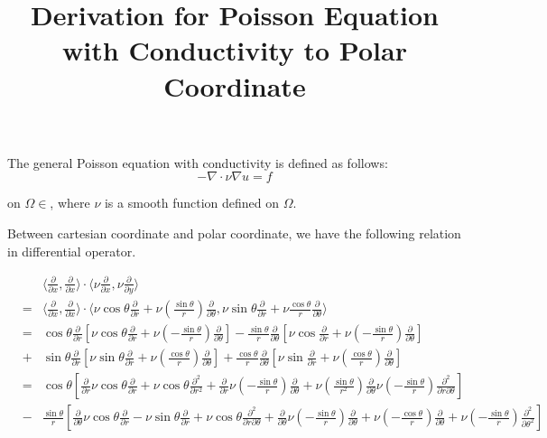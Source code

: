 \documentclass[11pt,letterpaper]{article}
\begin{document}
\title{{\bfseries Derivation for Poisson Equation with Conductivity to Polar Coordinate} }

The general Poisson equation with conductivity is defined as follows:
\begin{equation}
- \nabla \cdot \nu \nabla u = f
\end{equation}

on $\Omega \in $, where $\nu$ is a smooth function defined on $\Omega$.

Between cartesian coordinate and polar coordinate, we have the following relation in differential operator.

\begin{eqnarray}
&& \langle \frac{\partial}{\partial x}, \frac{\partial}{\partial x} \rangle \cdot \langle \nu \frac{\partial}{\partial x}, \nu \frac{\partial}{\partial y}\rangle  \\
&=&\langle \frac{\partial}{\partial x}, \frac{\partial}{\partial x}\rangle \cdot \langle \nu \cos\theta \frac{\partial}{\partial r}+\nu(\frac{\sin\theta}{r})\frac{\partial}{\partial \theta},\nu\sin\theta\frac{\partial}{\partial r}+\nu\frac{\cos\theta}{r}\frac{\partial}{\partial \theta}\rangle \\
&=& \cos\theta\frac{\partial}{\partial r} [\nu\cos\theta\frac{\partial}{\partial r} + \nu(-\frac{\sin\theta}{r})\frac{\partial}{\partial \theta}] - \frac{\sin\theta}{r}\frac{\partial}{\partial \theta}[\nu\cos\frac{\partial}{\partial r} + \nu(-\frac{\sin\theta}{r})\frac{\partial}{\partial \theta}] \\
&+& \sin\theta\frac{\partial}{\partial r} [\nu\sin\theta\frac{\partial}{\partial r} + \nu(\frac{\cos\theta}{r})\frac{\partial}{\partial \theta}] + \frac{\cos\theta}{r}\frac{\partial}{\partial \theta}[\nu\sin\frac{\partial}{\partial r} + \nu(\frac{\cos\theta}{r})\frac{\partial}{\partial \theta}] \\
&=& \cos\theta   [\frac{\partial}{\partial r} \nu \cos\theta\frac{\partial}{\partial r} + \nu\cos\theta\frac{\partial^2}{\partial r^2} + \frac{\partial}{\partial r} \nu (-\frac{\sin\theta}{r})\frac{\partial}{\partial \theta} + \nu(\frac{\sin\theta}{r^2})\frac{\partial}{\partial \theta} \nu (-\frac{\sin\theta}{r})\frac{\partial^2}{\partial r \partial \theta} ]\\
&-& \frac{\sin\theta}{r} [\frac{\partial}{\partial \theta} \nu \cos\theta \frac{\partial}{\partial r} - \nu \sin\theta \frac{\partial}{\partial r} + \nu \cos\theta \frac{\partial^2}{\partial r \partial \theta} + \frac{\partial}{\partial \theta} \nu (-\frac{\sin\theta}{r}) \frac{\partial}{\partial \theta} + \nu(-\frac{\cos\theta}{r})\frac{\partial}{\partial \theta} + \nu(-\frac{\sin\theta}{r})\frac{\partial^2}{\partial\theta^2}]\\

\end{eqnarray}
\end{document}
